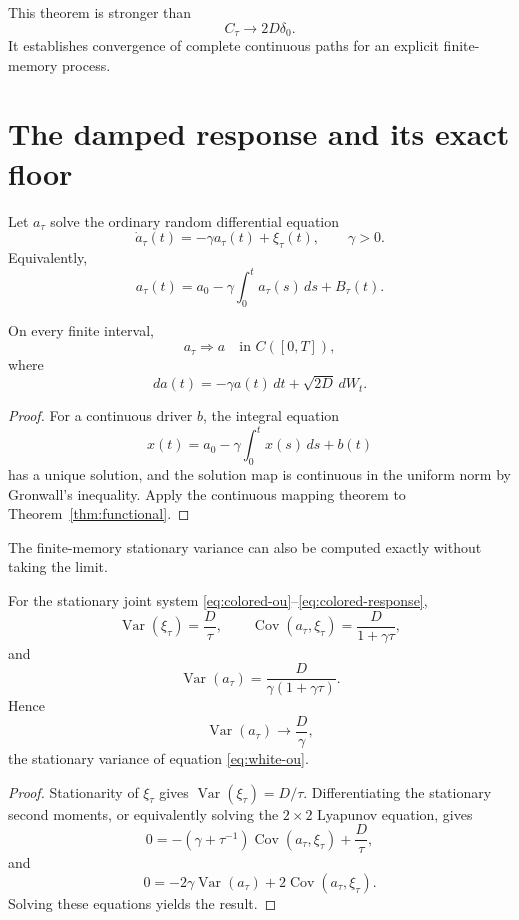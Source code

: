 \documentclass[11pt]{article}
\newcommand{\Var}{\operatorname{Var}}
\newcommand{\Cov}{\operatorname{Cov}}
\begin{document}
This theorem is stronger than
\[
C_\tau\to2D\delta_0.
\]
It establishes convergence of complete continuous paths for an explicit
finite-memory process.

\section{The damped response and its exact floor}

Let \(a_\tau\) solve the ordinary random differential equation
\begin{equation}
\dot a_\tau(t)
=-\gamma a_\tau(t)+\xi_\tau(t),
\qquad \gamma>0.
\label{eq:colored-response}
\end{equation}
Equivalently,
\[
a_\tau(t)
=a_0-\gamma\int_0^t a_\tau(s)\,ds+B_\tau(t).
\]

\begin{corollary}
\label{cor:ou-limit}
On every finite interval,
\[
a_\tau\Rightarrow a
\quad\text{in }C([0,T]),
\]
where
\begin{equation}
da(t)=-\gamma a(t)\,dt+\sqrt{2D}\,dW_t.
\label{eq:white-ou}
\end{equation}
\end{corollary}

\begin{proof}
For a continuous driver \(b\), the integral equation
\[
x(t)=a_0-\gamma\int_0^t x(s)\,ds+b(t)
\]
has a unique solution, and the solution map is continuous in the uniform
norm by Gronwall's inequality. Apply the continuous mapping theorem to
Theorem~\ref{thm:functional}.
\end{proof}

The finite-memory stationary variance can also be computed exactly without
taking the limit.

\begin{theorem}
\label{thm:finite-floor}
For the stationary joint system
\eqref{eq:colored-ou}--\eqref{eq:colored-response},
\[
\Var(\xi_\tau)=\frac{D}{\tau},
\qquad
\Cov(a_\tau,\xi_\tau)=\frac{D}{1+\gamma\tau},
\]
and
\begin{equation}
\Var(a_\tau)
=\frac{D}{\gamma(1+\gamma\tau)}.
\label{eq:finite-variance}
\end{equation}
Hence
\[
\Var(a_\tau)\longrightarrow\frac{D}{\gamma},
\]
the stationary variance of equation \eqref{eq:white-ou}.
\end{theorem}

\begin{proof}
Stationarity of \(\xi_\tau\) gives
\(\Var(\xi_\tau)=D/\tau\). Differentiating the stationary second
moments, or equivalently solving the \(2\times2\) Lyapunov equation,
gives
\[
0=-(\gamma+\tau^{-1})\Cov(a_\tau,\xi_\tau)
+\frac{D}{\tau},
\]
and
\[
0=-2\gamma\Var(a_\tau)
+2\Cov(a_\tau,\xi_\tau).
\]
Solving these equations yields the result.
\end{proof}
\end{document}
